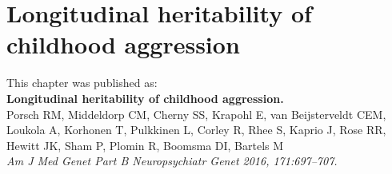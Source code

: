 \documentclass[header.tex]{subfiles}
\begin{document}
\chapter[Hertability of Aggression]{Longitudinal heritability of childhood aggression}
\label{cha:longHera}
This chapter was published as: \\
\textbf{Longitudinal heritability of childhood aggression.} \\
Porsch RM, Middeldorp CM, Cherny SS, Krapohl E, van Beijsterveldt CEM, Loukola A, Korhonen T, Pulkkinen L, Corley R, Rhee S, Kaprio J, Rose RR, Hewitt JK, Sham P, Plomin R, Boomsma DI, Bartels M \\
\textit{Am J Med Genet Part B Neuropsychiatr Genet 2016, 171:697–707.}





\newpage
\end{document}
